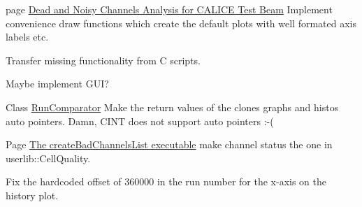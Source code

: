\label{todo__todo000007}
\hypertarget{todo__todo000007}{}
 
\begin{DoxyDescription}
\item[page \hyperlink{index}{Dead and Noisy Channels Analysis for CALICE Test Beam} ]Implement convenience draw functions which create the default plots with well formated axis labels etc. 

Transfer missing functionality from C scripts. 

Maybe implement GUI?


\end{DoxyDescription}

\label{todo__todo000001}
\hypertarget{todo__todo000001}{}
 
\begin{DoxyDescription}
\item[Class \hyperlink{class_run_comparator}{RunComparator} ]Make the return values of the clones graphs and histos auto pointers. Damn, CINT does not support auto pointers :-\/( 
\end{DoxyDescription}

\label{todo__todo000005}
\hypertarget{todo__todo000005}{}
 
\begin{DoxyDescription}
\item[Page \hyperlink{createBadChannelsList_exe}{The createBadChannelsList executable} ]make channel status the one in userlib::CellQuality.



Fix the hardcoded offset of 360000 in the run number for the x-\/axis on the history plot.


\end{DoxyDescription}